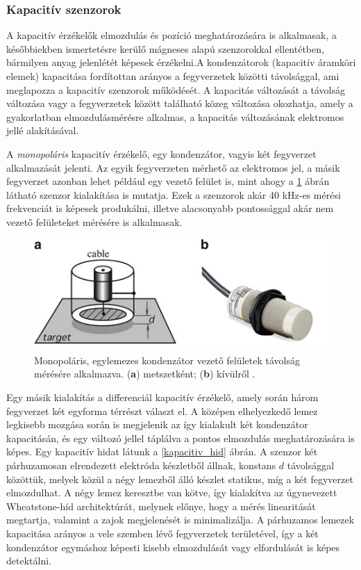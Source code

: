 \subsubsection{Kapacitív szenzorok}

A kapacitív érzékelők elmozdulás és pozíció meghatározására is alkalmasak, a későbbiekben ismertetésre kerülő mágneses alapú szenzorokkal ellentétben, bármilyen anyag jelenlétét képesek érzékelni.A kondenzátorok (kapacitív áramköri elemek) kapacitása fordítottan arányos a fegyverzetek közötti távolsággal, ami meglapozza a kapacitív szenzorok működését. A kapacitás változását a távolság változása vagy a fegyverzetek között található közeg változása okozhatja, amely a gyakorlatban elmozdulásmérésre alkalmas, a kapacitás változásának elektromos jellé alakításával.

 A \textit{monopoláris} kapacitív érzékelő, egy kondenzátor, vagyis két fegyverzet alkalmazását jelenti. Az egyik fegyverzeten mérhető az elektromos jel, a másik fegyverzet azonban lehet például egy vezető felület is, mint ahogy a \ref{kapacitiv_kabel} ábrán látható szenzor kialakítása is mutatja. Ezek a szenzorok akár 40 kHz-es mérési frekvenciát is képesek produkálni, illetve alacsonyabb pontossággal akár nem vezető felületeket mérésére is alkalmasak.
\begin{figure}
	\centering
	\includegraphics{figures/kapacitiv_szenzor_kabeles.png}
	\caption{Monopoláris, egylemezes kondenzátor vezető felületek távolság mérésére alkalmazva. (\textbf{a}) metszetként; (\textbf{b}) kívülről \cite{Fraden2016a}.}
	\label{kapacitiv_kabel}
\end{figure}
Egy másik kialakítás a differenciál kapacitív érzékelő, amely során három fegyverzet két egyforma térrészt választ el. A középen elhelyezkedő lemez legkisebb mozgása során is megjelenik az így kialakult két kondenzátor kapacitásán, és egy változó jellel táplálva a pontos elmozdulás meghatározására is képes.
Egy kapacitív hidat látunk a \ref{kapacitiv_hid} ábrán. A szenzor két párhuzamosan elrendezett elektróda készletből állnak, konstans $d$ távolsággal közöttük, melyek közül a négy lemezből álló készlet statikus, míg a két fegyverzet elmozdulhat. A négy lemez keresztbe van kötve, így kialakítva az úgynevezett Wheatstone-híd architektúrát, melynek előnye, hogy a mérés linearitását megtartja, valamint a zajok megjelenését is minimalizálja. A párhuzamos lemezek kapacitása arányos a vele szemben lévő fegyverzetek területével, így a két kondenzátor egymáshoz képesti kisebb elmozdulását vagy elfordulását is képes detektálni. 
